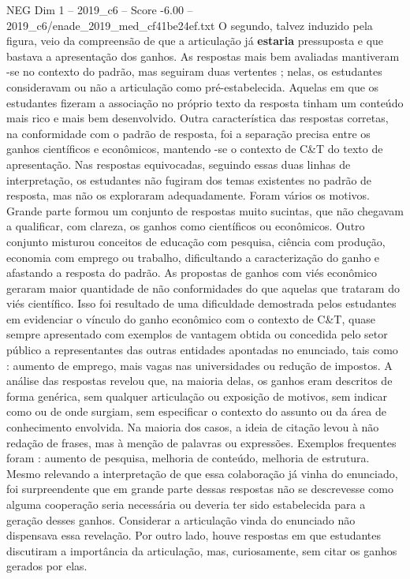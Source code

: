 \begin{textsample}{NEG Dim 1 – 2019\_c6 – Score -6.00 – 2019\_c6/enade\_2019\_med\_cf41be24ef.txt}
O segundo, talvez induzido pela figura, veio da compreensão de que a articulação já \textbf{estaria} pressuposta e que bastava a apresentação dos ganhos.
As respostas mais bem avaliadas mantiveram -se no contexto do padrão, mas seguiram duas vertentes ; nelas, os estudantes consideravam ou não a articulação como pré-estabelecida.
Aquelas em que os estudantes fizeram a associação no próprio texto da resposta tinham um conteúdo mais rico e mais bem desenvolvido.
Outra característica das respostas corretas, na conformidade com o padrão de resposta, foi a separação precisa entre os ganhos científicos e econômicos, mantendo -se o contexto de C\&T do texto de apresentação.
Nas respostas equivocadas, seguindo essas duas linhas de interpretação, os estudantes não fugiram dos temas existentes no padrão de resposta, mas não os exploraram adequadamente.
Foram vários os motivos.
Grande parte formou um conjunto de respostas muito sucintas, que não chegavam a qualificar, com clareza, os ganhos como científicos ou econômicos.
Outro conjunto misturou conceitos de educação com pesquisa, ciência com produção, economia com emprego ou trabalho, dificultando a caracterização do ganho e afastando a resposta do padrão.
As propostas de ganhos com viés econômico geraram maior quantidade de não conformidades do que aquelas que trataram do viés científico.
Isso foi resultado de uma dificuldade demostrada pelos estudantes em evidenciar o vínculo do ganho econômico com o contexto de C\&T, quase sempre apresentado com exemplos de vantagem obtida ou concedida pelo setor público a representantes das outras entidades apontadas no enunciado, tais como : aumento de emprego, mais vagas nas universidades ou redução de impostos.
A análise das respostas revelou que, na maioria delas, os ganhos eram descritos de forma genérica, sem qualquer articulação ou exposição de motivos, sem indicar como ou de onde surgiam, sem especificar o contexto do assunto ou da área de conhecimento envolvida.
Na maioria dos casos, a ideia de citação levou à não redação de frases, mas à menção de palavras ou expressões.
Exemplos frequentes foram : aumento de pesquisa, melhoria de conteúdo, melhoria de estrutura.
Mesmo relevando a interpretação de que essa colaboração já vinha do enunciado, foi surpreendente que em grande parte dessas respostas não se descrevesse como alguma cooperação seria necessária ou deveria ter sido estabelecida para a geração desses ganhos.
Considerar a articulação vinda do enunciado não dispensava essa revelação.
Por outro lado, houve respostas em que estudantes discutiram a importância da articulação, mas, curiosamente, sem citar os ganhos gerados por elas.

\end{textsample}
